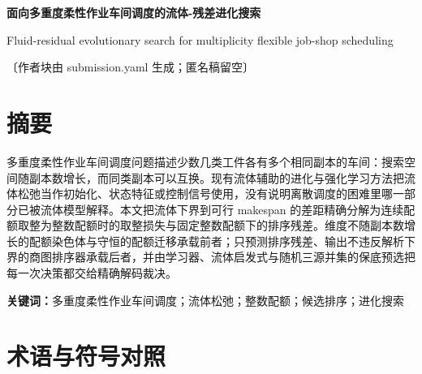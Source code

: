 \documentclass[11pt,a4paper,fontset=fandol]{ctexart}
\theoremstyle{plain}
\begin{document}
\begin{center}
{\LARGE\bfseries 面向多重度柔性作业车间调度的流体-残差进化搜索\par}
\vspace{6pt}
{\large Fluid-residual evolutionary search for multiplicity flexible job-shop scheduling\par}
\vspace{10pt}
{\large 〔作者块由 submission.yaml 生成；匿名稿留空〕\par}
\end{center}
\section*{摘要}
\noindent
多重度柔性作业车间调度问题描述少数几类工件各有多个相同副本的车间：搜索空间随副本数增长，而同类副本可以互换。现有流体辅助的进化与强化学习方法把流体松弛当作初始化、状态特征或控制信号使用，没有说明离散调度的困难里哪一部分已被流体模型解释。本文把流体下界到可行 makespan 的差距精确分解为连续配额取整为整数配额时的取整损失与固定整数配额下的排序残差。维度不随副本数增长的配额染色体与守恒的配额迁移承载前者；只预测排序残差、输出不违反解析下界的商图排序器承载后者，并由学习器、流体启发式与随机三源并集的保底预选把每一次决策都交给精确解码裁决。

\vspace{6pt}
\noindent\textbf{关键词：}多重度柔性作业车间调度；流体松弛；整数配额；候选排序；进化搜索
\clearpage
\tableofcontents
\clearpage






\appendix
\section{术语与符号对照}



\end{document}
